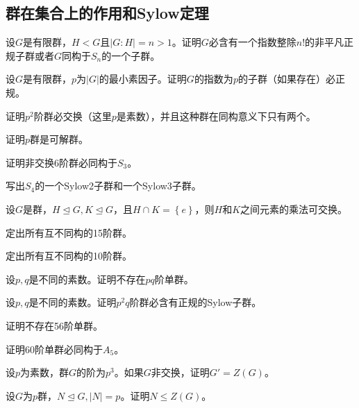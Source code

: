 \subsection{群在集合上的作用和Sylow定理}
\begin{prob}
设$G$是有限群，$H<G$且$\left\lvert G:H \right\rvert =n>1$。证明$G$必含有一个指数整除$n!$的非平凡正规子群或者$G$同构于$S_{n}$的一个子群。
\end{prob}
\begin{prob}
设$G$是有限群，$p$为$\left\lvert G \right\rvert $的最小素因子。证明$G$的指数为$p$的子群（如果存在）必正规。
\end{prob}
\begin{prob}
证明$p^{2}$阶群必交换（这里$p$是素数），并且这种群在同构意义下只有两个。
\end{prob}
\begin{prob}
证明$p$群是可解群。
\end{prob}
\begin{prob}
证明非交换6阶群必同构于$S_{3}$。
\end{prob}
\begin{prob}
写出$S_{4}$的一个Sylow2子群和一个Sylow3子群。
\end{prob}
\begin{prob}
设$G$是群，$H\trianglelefteq G,K\trianglelefteq G$，且$H\cap K=\left\{e \right\}$，则$H$和$K$之间元素的乘法可交换。
\end{prob}
\begin{prob}
定出所有互不同构的15阶群。
\end{prob}
\begin{prob}
定出所有互不同构的10阶群。
\end{prob}
\begin{prob}
设$p,q$是不同的素数。证明不存在$pq$阶单群。
\end{prob}
\begin{prob}
设$p,q$是不同的素数。证明$p^{2}q$阶群必含有正规的Sylow子群。
\end{prob}
\begin{prob}
证明不存在56阶单群。
\end{prob}
\begin{probx}
证明60阶单群必同构于$A_{5}$。
\end{probx}
\begin{prob}
设$p$为素数，群$G$的阶为$p^{3}$。如果$G$非交换，证明$G'=Z\left(G\right)$。
\end{prob}
\begin{prob}
设$G$为$p$群，$N\trianglelefteq G,\left\lvert N \right\rvert =p$。证明$N\leqslant Z\left(G\right)$。
\end{prob}
